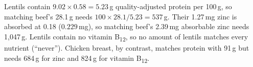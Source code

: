 Lentils contain $9.02\times0.58 = 5.23$\,g quality-adjusted protein per 100\,g, so matching beef's 28.1\,g needs $100\times28.1/5.23 = 537$\,g. Their 1.27\,mg zinc is absorbed at 0.18 ($0.229$\,mg), so matching beef's 2.39\,mg absorbable zinc needs 1{,}047\,g. Lentils contain no vitamin B\textsubscript{12}, so no amount of lentils matches every nutrient (``never''). Chicken breast, by contrast, matches protein with 91\,g but needs 684\,g for zinc and 824\,g for vitamin B\textsubscript{12}.
